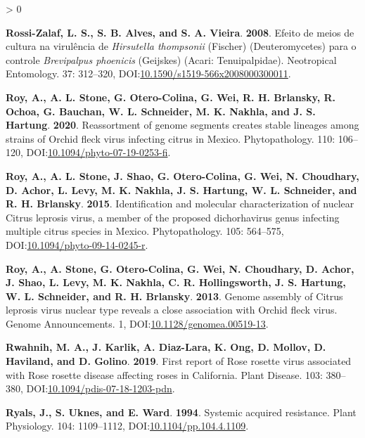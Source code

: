 \documentclass{ufdissertation}[overrideChapters] %
\newlength{\cslhangindent}
\newenvironment{CSLReferences}[2] %
 {%
  \setlength{\parindent}{0pt}
  \ifodd #1 \everypar{\setlength{\hangindent}{\cslhangindent}}\ignorespaces\fi
  \ifnum #2 > 0
  \setlength{\parskip}{#2\baselineskip}
  \fi
 }%
 {}
\begin{document}
{\begin{CSLReferences}{1}{1}
\leavevmode{}%
\textbf{Rossi-Zalaf, L. S., S. B. Alves, and S. A. Vieira}. \textbf{2008}. Efeito de meios de cultura na virul{ê}ncia de {\emph{Hirsutella thompsonii}} ({Fischer}) ({Deuteromycetes}) para o controle {\emph{Brevipalpus phoenicis}} ({Geijskes}) ({Acari}: {Tenuipalpidae}). Neotropical Entomology. 37: 312--320, DOI:\href{https://doi.org/10.1590/s1519-566x2008000300011}{10.1590/s1519-566x2008000300011}.

\leavevmode{}%
\textbf{Roy, A., A. L. Stone, G. Otero-Colina, G. Wei, R. H. Brlansky, R. Ochoa, G. Bauchan, W. L. Schneider, M. K. Nakhla, and J. S. Hartung}. \textbf{2020}. Reassortment of genome segments creates stable lineages among strains of {Orchid fleck virus} infecting citrus in {Mexico}. Phytopathology{\textregistered}. 110: 106--120, DOI:\href{https://doi.org/10.1094/phyto-07-19-0253-fi}{10.1094/phyto-07-19-0253-fi}.

\leavevmode{}%
\textbf{Roy, A., A. L. Stone, J. Shao, G. Otero-Colina, G. Wei, N. Choudhary, D. Achor, L. Levy, M. K. Nakhla, J. S. Hartung, W. L. Schneider, and R. H. Brlansky}. \textbf{2015}. Identification and molecular characterization of nuclear {Citrus leprosis virus}, a member of the proposed dichorhavirus genus infecting multiple citrus species in {Mexico}. Phytopathology{\textregistered}. 105: 564--575, DOI:\href{https://doi.org/10.1094/phyto-09-14-0245-r}{10.1094/phyto-09-14-0245-r}.

\leavevmode{}%
\textbf{Roy, A., A. Stone, G. Otero-Colina, G. Wei, N. Choudhary, D. Achor, J. Shao, L. Levy, M. K. Nakhla, C. R. Hollingsworth, J. S. Hartung, W. L. Schneider, and R. H. Brlansky}. \textbf{2013}. Genome assembly of {Citrus leprosis virus} nuclear type reveals a close association with {Orchid fleck virus}. Genome Announcements. 1, DOI:\href{https://doi.org/10.1128/genomea.00519-13}{10.1128/genomea.00519-13}.

\leavevmode{}%
\textbf{Rwahnih, M. A., J. Karlik, A. Diaz-Lara, K. Ong, D. Mollov, D. Haviland, and D. Golino}. \textbf{2019}. First report of {Rose rosette virus} associated with {Rose rosette disease} affecting roses in {California}. Plant Disease. 103: 380--380, DOI:\href{https://doi.org/10.1094/pdis-07-18-1203-pdn}{10.1094/pdis-07-18-1203-pdn}.

\leavevmode{}%
\textbf{Ryals, J., S. Uknes, and E. Ward}. \textbf{1994}. Systemic acquired resistance. Plant Physiology. 104: 1109--1112, DOI:\href{https://doi.org/10.1104/pp.104.4.1109}{10.1104/pp.104.4.1109}.


\end{CSLReferences}}
\end{document}

